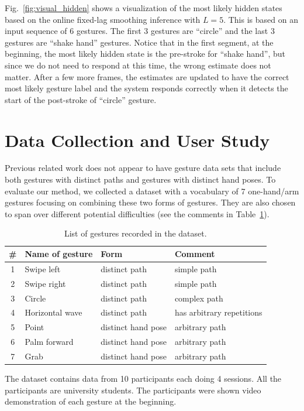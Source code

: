 \documentclass[conference]{IEEEtran}
\begin{document}
Fig.~\ref{fig:visual_hidden} shows a visualization of the
most likely hidden states based on the online fixed-lag smoothing inference
with $L = 5$.
This is based on an input sequence of 6 gestures. The first 3 gestures are
``circle'' and the last 3 gestures are ``shake hand'' gestures. Notice that in
the first segment, at the beginning, the most likely hidden state is the
pre-stroke for ``shake hand'', but since we do not need to respond at this time,
the wrong estimate does not matter. After a few more frames, the estimates are
updated to have the correct most likely gesture label and the system
responds correctly when it detects the start of the post-stroke of ``circle''
gesture.

\section{Data Collection and User Study}
Previous related work does not appear to have gesture data sets
that include both gestures with distinct paths and gestures with distinct hand
poses. To evaluate our method, we collected a dataset with a vocabulary of 7
one-hand/arm gestures focusing on combining these two forms of gestures. They
are also chosen to span over different potential difficulties (see the comments in Table~\ref{tab:gestures}).

\begin{table}
\caption{List of gestures recorded in the dataset.}
\label{tab:gestures}
\centering
\begin{tabular}{|c|l|l|l|}
\hline
\# & Name of gesture & Form & Comment \\
\hline
1 & Swipe left & distinct path & simple path \\
\hline
2 & Swipe right & distinct path & simple path \\
\hline
3 & Circle & distinct path & complex path \\
\hline
4 & Horizontal wave & distinct path & has arbitrary repetitions \\
\hline
5 & Point & distinct hand pose & arbitrary path \\
\hline
6 & Palm forward & distinct hand pose & arbitrary path \\
\hline
7 & Grab & distinct hand pose & arbitrary path \\
\hline
\end{tabular}
\end{table}

The dataset contains data from 10 participants each
doing 4 sessions. All the participants are university students.
The participants were shown video demonstration of each gesture at the beginning. 
\end{document}
